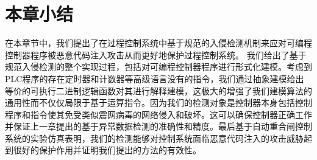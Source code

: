 \section{本章小结}
\label{sec:insertimage}

在本章节中，我们提出了在过程控制系统中基于规范的入侵检测机制来应对可编程控制器程序被恶意代码注入攻击从而更好地保护过程控制系统。 我们给出了基于规范入侵检测的整个实现过程，包括对可编程控制器程序进行形式化建模。考虑到PLC程序的存在定时器和计数器等高级语言没有的指令，我们通过抽象建模给出等价的可执行二进制逻辑函数对其进行解释建模，这极大的增强了我们建模算法的通用性而不仅仅局限于基于运算指令。因为我们的检测对象是控制器本身包括控制程序和指令使其免受类似震网病毒的网络侵入和破坏。这可以确保控制器正确工作并保证上一章提出的基于异常数据检测的准确性和精度。最后基于自动重合闸控制系统的实验仿真表明，我们的检测能够对控制系统面临恶意代码注入的攻击威胁起到很好的保护作用并证明我们提出的方法的有效性。

